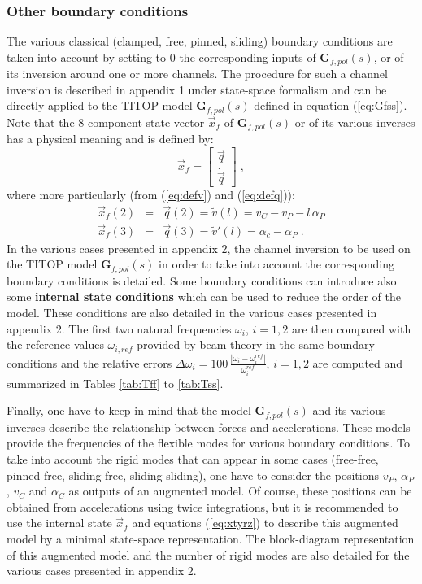 \documentclass[smallcondensed]{svjour3}     %
\begin{document}
\subsubsection{Other boundary conditions}
The various classical (clamped, free, pinned, sliding) boundary conditions are taken into account by setting to $0$ the corresponding inputs of $\mathbf{G}_{f,pol}(s)$, or of its inversion around one or more channels. The procedure for such a channel inversion is described in appendix 1 under state-space formalism and can be directly applied to the TITOP model  $\mathbf{G}_{f,pol}(s)$ defined in equation (\ref{eq:Gfss}). Note that the $8$-component state vector $\vec{x}_f$ of $\mathbf{G}_{f,pol}(s)$ or of its various inverses has a physical meaning and is defined by:
\[
\vec{x}_f=\left[ \begin {array}{c} \vec{q}  \\ \dot{\vec{q}} \end{array}\right]\;,
\]
where more particularly (from (\ref{eq:defv}) and (\ref{eq:defq})):
\begin{eqnarray}\label{eq:xtyrz}
\vec{x}_f(2)&=& \vec{q}(2)= \widetilde{v}(l) = v_C-v_P-l\,\alpha_P\\ \nonumber
\vec{x}_f(3)&=& \vec{q}(3)= \widetilde{v}'(l)= \alpha_c-\alpha_P\;.
\end{eqnarray}
In the various cases presented in appendix 2, the channel inversion to be used on the TITOP model $\mathbf{G}_{f,pol}(s)$ in order to take into account the corresponding boundary conditions is detailed.  Some boundary conditions can introduce also some \textbf{internal state conditions} which can be used to reduce the order of the model. These conditions are also detailed in the various cases presented in appendix 2. The first two natural frequencies $\omega_i$, $i=1,2$ are then compared with the reference values $\omega_{i,ref}$ provided by beam theory \cite{bishop1979mechanics} in the same boundary conditions and the relative errors $\Delta \omega_i=100\,\frac{|\omega_i-\omega_i^{ref}|}{\omega_i^{ref}}$, $i=1,2$ are computed and summarized in Tables \ref{tab:Tff} to \ref{tab:Tss}.

Finally, one have to keep in mind that the model $\mathbf{G}_{f,pol}(s)$ and its various inverses describe the relationship between forces and accelerations. These models provide the frequencies of the flexible modes for various boundary conditions. To take into account the rigid modes that can appear in some cases (free-free, pinned-free, sliding-free, sliding-sliding), one have to consider the positions $v_P$, $\alpha_P$, $v_C$ and $\alpha_C$ as outputs of an augmented model. Of course, these positions can be obtained from accelerations using twice integrations, but it is recommended to use the internal state $\vec{x}_f$ and equations (\ref{eq:xtyrz}) to describe this augmented model by a minimal state-space representation. The block-diagram representation of this augmented model and the number of rigid modes are also detailed for the various cases presented in appendix 2.
\end{document}
